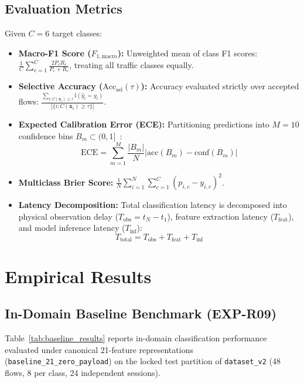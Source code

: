 \documentclass[conference]{IEEEtran}
\begin{document}
\subsection{Evaluation Metrics}
Given $C=6$ target classes:
\begin{itemize}
    \item \textbf{Macro-F1 Score ($F_{1,\text{macro}}$):} Unweighted mean of class F1 scores: $\frac{1}{C}\sum_{c=1}^C \frac{2 P_c R_c}{P_c + R_c}$, treating all traffic classes equally.
    \item \textbf{Selective Accuracy ($\text{Acc}_{\text{sel}}(\tau)$):} Accuracy evaluated strictly over accepted flows: $\frac{\sum_{i: C(\mathbf{x}_i) \ge \tau} \mathbb{I}(\hat{y}_i = y_i)}{|\{i : C(\mathbf{x}_i) \ge \tau\}|}$.
    \item \textbf{Expected Calibration Error (ECE):} Partitioning predictions into $M=10$ confidence bins $B_m \subset (0, 1]$~\cite{guo2017calibration}:
    \begin{equation}
        \text{ECE} = \sum_{m=1}^M \frac{|B_m|}{N} \left| \text{acc}(B_m) - \text{conf}(B_m) \right|
    \end{equation}
    \item \textbf{Multiclass Brier Score:} $\frac{1}{N}\sum_{i=1}^N \sum_{c=1}^C (p_{i,c} - y_{i,c})^2$.
    \item \textbf{Latency Decomposition:} Total classification latency is decomposed into physical observation delay ($T_{\text{obs}} = t_N - t_1$), feature extraction latency ($T_{\text{feat}}$), and model inference latency ($T_{\text{inf}}$):
    \begin{equation}
        T_{\text{total}} = T_{\text{obs}} + T_{\text{feat}} + T_{\text{inf}}
    \end{equation}
\end{itemize}

\section{Empirical Results}
\label{sec:results}

\subsection{In-Domain Baseline Benchmark (EXP-R09)}
Table~\ref{tab:baseline_results} reports in-domain classification performance evaluated under canonical 21-feature representations (\texttt{baseline\_21\_zero\_payload}) on the locked test partition of \texttt{dataset\_v2} (48 flows, 8 per class, 24 independent sessions).
\end{document}
